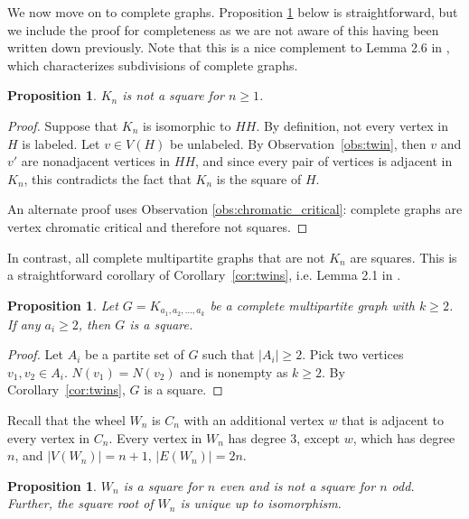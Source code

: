\documentclass{article}
\newtheorem{proposition}[theorem]{Proposition}
\theoremstyle{definition}
\begin{document}
We now move on to complete graphs. Proposition \ref{pr:complete} below is straightforward, but we include the proof for completeness as we are not aware of this having been written down previously. Note that this is a nice complement to Lemma 2.6 in \cite{AAP}, which characterizes subdivisions of complete graphs. 

\begin{proposition} \label{pr:complete}
    $K_n$ is not a square for $n \geq 1$.
\end{proposition}

\begin{proof}
    Suppose that $K_n$ is isomorphic to $HH$. By definition, not every vertex in $H$ is labeled. Let $v\in V(H)$ be unlabeled. By Observation~\ref{obs:twin}, then $v$ and $v'$ are nonadjacent vertices in $HH$, and since every pair of vertices is adjacent in $K_n$, this contradicts the fact that $K_n$ is the square of $H$. 

An alternate proof uses Observation \ref{obs:chromatic_critical}: complete graphs are vertex chromatic critical and therefore not squares.
\end{proof}

In contrast, all complete multipartite graphs that are not $K_n$ are squares. This is a straightforward corollary of Corollary~\ref{cor:twins}, i.e. Lemma 2.1 in \cite{AAP}. 

\begin{proposition} \label{pr:multipartite}
    Let $G = K_{a_1, a_2, \dotsc, a_k}$ be a complete multipartite graph with $k \geq 2$. If any $a_i \geq 2$, then $G$ is a square.
\end{proposition}

\begin{proof}
    Let $A_i$ be a partite set of $G$ such that $|A_i| \geq 2$. Pick two vertices $v_1, v_2 \in A_i$. $N(v_1) = N(v_2)$ and is nonempty as $k \geq 2$. By Corollary~\ref{cor:twins}, $G$ is a square. 
\end{proof}


Recall that the wheel $W_n$ is $C_n$ with an additional vertex $w$ that is adjacent to every vertex in $C_n$. Every vertex in $W_n$ has degree 3, except $w$, which has degree $n$, and $|V(W_n)|=n+1$, $|E(W_n)|=2n$. 


\begin{proposition} \label{pr:wheels}
$W_n$ is a square for $n$ even and is not a square for $n$ odd. Further, the square root of $W_n$ is unique up to isomorphism. 
\end{proposition}
\end{document}
